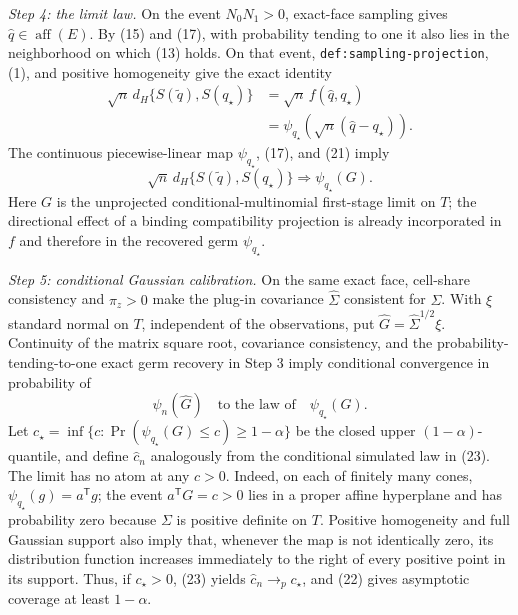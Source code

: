 \emph{Step 4: the limit law.}
On the event \(N_0N_1>0\), exact-face sampling gives \(\widehat q\in\operatorname{aff}(E)\).  By (15) and (17), with probability tending to one it also lies in the neighborhood on which (13) holds.  On that event, \texttt{def:sampling-projection}, (1), and positive homogeneity give the exact identity
\[
\begin{split}
 \sqrt n\,d_H\{S(\widetilde q),S(q_\star)\}
 &=\sqrt n\,f(\widehat q,q_\star)\\
 &=\psi_{q_\star}\!\left(\sqrt n(\widehat q-q_\star)\right).
\end{split}
\tag{21}
\]
The continuous piecewise-linear map \(\psi_{q_\star}\), (17), and (21) imply
\[
 \sqrt n\,d_H\{S(\widetilde q),S(q_\star)\}
 \Rightarrow \psi_{q_\star}(G).
\tag{22}
\]
Here \(G\) is the unprojected conditional-multinomial first-stage limit on \(T\); the directional effect of a binding compatibility projection is already incorporated in \(f\) and therefore in the recovered germ \(\psi_{q_\star}\).

\emph{Step 5: conditional Gaussian calibration.}
On the same exact face, cell-share consistency and \(\pi_z>0\) make the plug-in covariance \(\widehat\Sigma\) consistent for \(\Sigma\).  With \(\xi\) standard normal on \(T\), independent of the observations, put \(\widehat G=\widehat\Sigma^{1/2}\xi\).  Continuity of the matrix square root, covariance consistency, and the probability-tending-to-one exact germ recovery in Step 3 imply conditional convergence in probability of
\[
 \widehat\psi_n(\widehat G)
 \quad\text{to the law of}\quad
 \psi_{q_\star}(G).
\tag{23}
\]
Let \(c_\star=\inf\{c:\Pr(\psi_{q_\star}(G)\leq c)\geq1-\alpha\}\) be the closed upper \((1-\alpha)\)-quantile, and define \(\widehat c_n\) analogously from the conditional simulated law in (23).  The limit has no atom at any \(c>0\).  Indeed, on each of finitely many cones, \(\psi_{q_\star}(g)=a^{\mathsf T}g\); the event \(a^{\mathsf T}G=c>0\) lies in a proper affine hyperplane and has probability zero because \(\Sigma\) is positive definite on \(T\).  Positive homogeneity and full Gaussian support also imply that, whenever the map is not identically zero, its distribution function increases immediately to the right of every positive point in its support.  Thus, if \(c_\star>0\), (23) yields \(\widehat c_n\to_p c_\star\), and (22) gives asymptotic coverage at least \(1-\alpha\).

